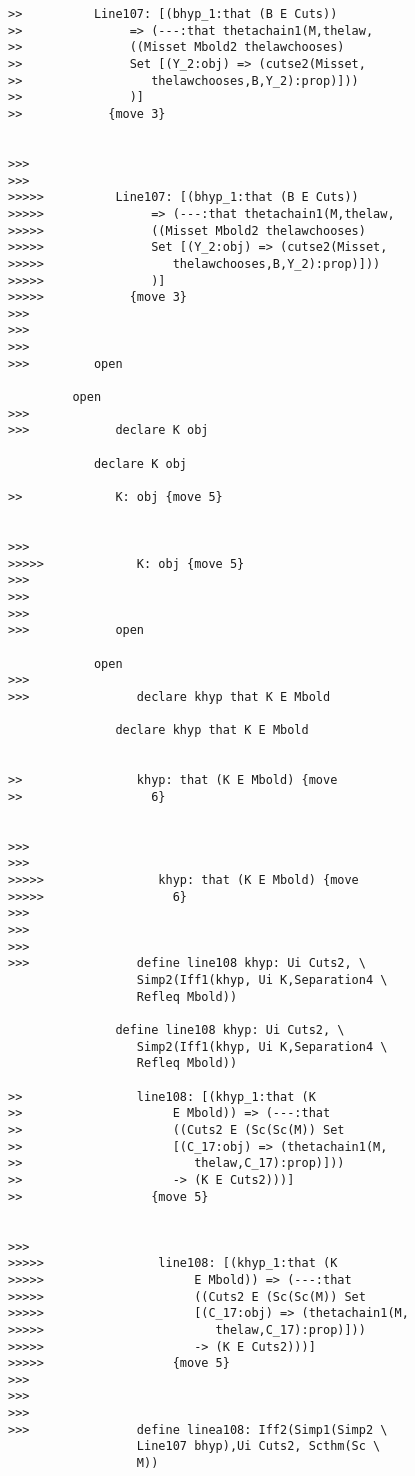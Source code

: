 \documentclass[12pt]{article}
\begin{document}
\begin{verbatim}
>>          Line107: [(bhyp_1:that (B E Cuts))
>>               => (---:that thetachain1(M,thelaw,
>>               ((Misset Mbold2 thelawchooses)
>>               Set [(Y_2:obj) => (cutse2(Misset,
>>                  thelawchooses,B,Y_2):prop)]))
>>               )]
>>            {move 3}


>>>
>>>
>>>>>          Line107: [(bhyp_1:that (B E Cuts))
>>>>>               => (---:that thetachain1(M,thelaw,
>>>>>               ((Misset Mbold2 thelawchooses)
>>>>>               Set [(Y_2:obj) => (cutse2(Misset,
>>>>>                  thelawchooses,B,Y_2):prop)]))
>>>>>               )]
>>>>>            {move 3}
>>>
>>>
>>>
>>>         open

         open
>>>
>>>            declare K obj

            declare K obj

>>             K: obj {move 5}


>>>
>>>>>             K: obj {move 5}
>>>
>>>
>>>
>>>            open

            open
>>>
>>>               declare khyp that K E Mbold

               declare khyp that K E Mbold


>>                khyp: that (K E Mbold) {move
>>                  6}


>>>
>>>
>>>>>                khyp: that (K E Mbold) {move
>>>>>                  6}
>>>
>>>
>>>
>>>               define line108 khyp: Ui Cuts2, \
                  Simp2(Iff1(khyp, Ui K,Separation4 \
                  Refleq Mbold))

               define line108 khyp: Ui Cuts2, \
                  Simp2(Iff1(khyp, Ui K,Separation4 \
                  Refleq Mbold))

>>                line108: [(khyp_1:that (K
>>                     E Mbold)) => (---:that
>>                     ((Cuts2 E (Sc(Sc(M)) Set
>>                     [(C_17:obj) => (thetachain1(M,
>>                        thelaw,C_17):prop)]))
>>                     -> (K E Cuts2)))]
>>                  {move 5}


>>>
>>>>>                line108: [(khyp_1:that (K
>>>>>                     E Mbold)) => (---:that
>>>>>                     ((Cuts2 E (Sc(Sc(M)) Set
>>>>>                     [(C_17:obj) => (thetachain1(M,
>>>>>                        thelaw,C_17):prop)]))
>>>>>                     -> (K E Cuts2)))]
>>>>>                  {move 5}
>>>
>>>
>>>
>>>               define linea108: Iff2(Simp1(Simp2 \
                  Line107 bhyp),Ui Cuts2, Scthm(Sc \
                  M))


\end{verbatim}
\end{document}
